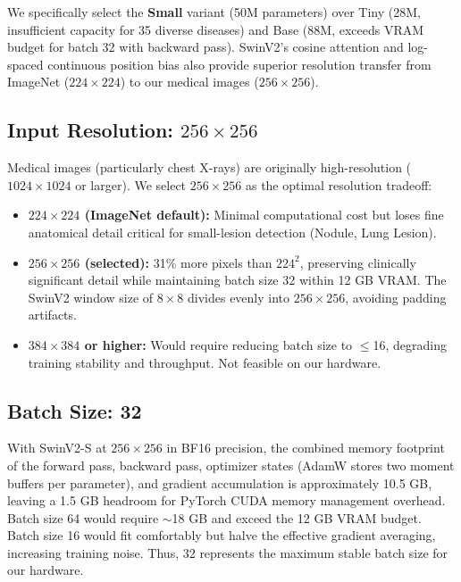 \documentclass[12pt,a4paper]{report}
\begin{document}
We specifically select the \textbf{Small} variant (50M parameters) over Tiny (28M, insufficient capacity for 35 diverse diseases) and Base (88M, exceeds VRAM budget for batch 32 with backward pass). SwinV2's cosine attention and log-spaced continuous position bias also provide superior resolution transfer from ImageNet ($224 \times 224$) to our medical images ($256 \times 256$).

\subsection{Input Resolution: $256 \times 256$}

Medical images (particularly chest X-rays) are originally high-resolution ($1024 \times 1024$ or larger). We select $256 \times 256$ as the optimal resolution tradeoff:

\begin{itemize}
    \item \textbf{$224 \times 224$ (ImageNet default):} Minimal computational cost but loses fine anatomical detail critical for small-lesion detection (Nodule, Lung Lesion).
    \item \textbf{$256 \times 256$ (selected):} 31\% more pixels than $224^2$, preserving clinically significant detail while maintaining batch size 32 within 12 GB VRAM. The SwinV2 window size of $8 \times 8$ divides evenly into $256 \times 256$, avoiding padding artifacts.
    \item \textbf{$384 \times 384$ or higher:} Would require reducing batch size to $\leq$16, degrading training stability and throughput. Not feasible on our hardware.
\end{itemize}

\subsection{Batch Size: 32}

With SwinV2-S at $256 \times 256$ in BF16 precision, the combined memory footprint of the forward pass, backward pass, optimizer states (AdamW stores two moment buffers per parameter), and gradient accumulation is approximately 10.5 GB, leaving a 1.5 GB headroom for PyTorch CUDA memory management overhead. Batch size 64 would require $\sim$18 GB and exceed the 12 GB VRAM budget. Batch size 16 would fit comfortably but halve the effective gradient averaging, increasing training noise. Thus, 32 represents the maximum stable batch size for our hardware.
\end{document}

